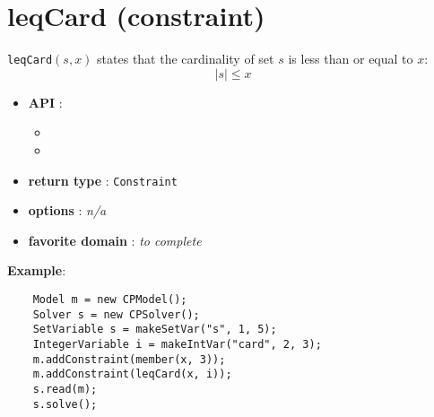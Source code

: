 \label{leqcard}
\hypertarget{leqcard}{}

\section{leqCard (constraint)}\label{leqcard:leqcardconstraint}\hypertarget{leqcard:leqcardconstraint}{}
\begin{notedef}
  \texttt{leqCard}$(s,x)$ states that the cardinality of set $s$ is less than or equal to $x$:
$$|s| \le x$$
\end{notedef}

\begin{itemize}
	\item \textbf{API} :
	\begin{itemize}
		\item {}
		\item {}
	\end{itemize}
	\item \textbf{return type} : \texttt{Constraint}
	\item \textbf{options} : \emph{n/a}
	\item \textbf{favorite domain} : \emph{to complete}
\end{itemize}

\textbf{Example}:
\begin{lstlisting}
	Model m = new CPModel();
	Solver s = new CPSolver();
	SetVariable s = makeSetVar("s", 1, 5);
	IntegerVariable i = makeIntVar("card", 2, 3);
	m.addConstraint(member(x, 3));
	m.addConstraint(leqCard(x, i));
	s.read(m);
	s.solve();
\end{lstlisting}
